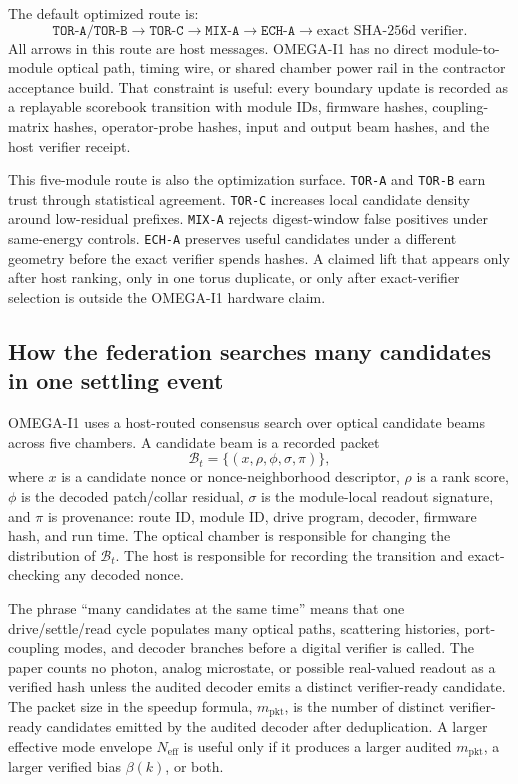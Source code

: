 \documentclass[11pt]{article}
\theoremstyle{definition}
\theoremstyle{remark}
\begin{document}
The default optimized route is:
\[
\texttt{TOR-A/TOR-B}
\longrightarrow
\texttt{TOR-C}
\longrightarrow
\texttt{MIX-A}
\longrightarrow
\texttt{ECH-A}
\longrightarrow
\text{exact SHA-256d verifier}.
\]
All arrows in this route are host messages. OMEGA-I1 has no direct
module-to-module optical path, timing wire, or shared chamber power rail in the
contractor acceptance build. That constraint is useful: every boundary update is
recorded as a replayable scorebook transition with module IDs, firmware hashes,
coupling-matrix hashes, operator-probe hashes, input and output beam hashes, and
the host verifier receipt.

This five-module route is also the optimization surface. \texttt{TOR-A} and
\texttt{TOR-B} earn trust through statistical agreement. \texttt{TOR-C}
increases local candidate density around low-residual prefixes. \texttt{MIX-A}
rejects digest-window false positives under same-energy controls.
\texttt{ECH-A} preserves useful candidates under a different geometry before the
exact verifier spends hashes. A claimed lift that appears only after host
ranking, only in one torus duplicate, or only after exact-verifier selection is
outside the OMEGA-I1 hardware claim.

\subsection{How the federation searches many candidates in one settling event}

OMEGA-I1 uses a host-routed consensus search over optical candidate beams across
five chambers. A candidate beam is a recorded packet
\[
\mathcal B_t=\{(x,\rho,\phi,\sigma,\pi)\},
\]
where \(x\) is a candidate nonce or nonce-neighborhood descriptor, \(\rho\) is a
rank score, \(\phi\) is the decoded patch/collar residual, \(\sigma\) is the
module-local readout signature, and \(\pi\) is provenance: route ID, module ID,
drive program, decoder, firmware hash, and run time. The optical chamber is
responsible for changing the distribution of \(\mathcal B_t\). The host is
responsible for recording the transition and exact-checking any decoded nonce.

The phrase ``many candidates at the same time'' means that one drive/settle/read
cycle populates many optical paths, scattering histories, port-coupling modes,
and decoder branches before a digital verifier is called. The paper counts no
photon, analog microstate, or possible real-valued readout as a verified hash
unless the audited decoder emits a distinct verifier-ready candidate. The packet
size in the speedup formula, \(m_{\mathrm{pkt}}\), is the number of distinct
verifier-ready candidates emitted by the audited decoder after deduplication. A
larger effective mode envelope
\(N_{\mathrm{eff}}\) is useful only if it produces a larger audited
\(m_{\mathrm{pkt}}\), a larger verified bias \(\beta(k)\), or both.
\end{document}
